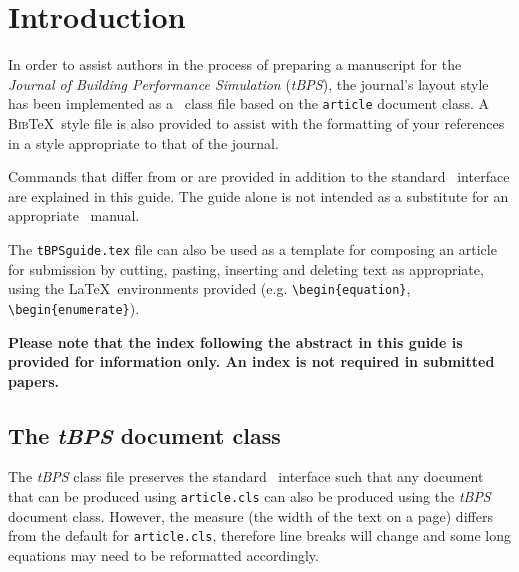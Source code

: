 \documentclass{tBPS2e}
\theoremstyle{plain}
\theoremstyle{definition}
\theoremstyle{remark}
\begin{document}
\section{Introduction}

In order to assist authors in the process of preparing a manuscript for the \textit{Journal of Building Performance Simulation} (\textit{tBPS}), the journal's layout style has been implemented as a \LaTeXe\ class file based on the \texttt{article} document class. A \textsc{Bib}\TeX\ style file is also provided to assist with the formatting of your references in a style appropriate to that of the journal.

Commands that differ from or are provided in addition to the standard \LaTeXe\ interface are explained in this guide. The guide alone is not intended as a substitute for an appropriate \LaTeXe\ manual.

The \texttt{tBPSguide.tex} file can also be used as a template for composing an article for submission by cutting, pasting, inserting and
deleting text as appropriate, using the \LaTeX\ environments provided (e.g. \verb"\begin{equation}", \verb"\begin{enumerate}").

\textbf{Please note that the index following the abstract in this guide is provided for information only. An index is not required in submitted papers.}


\subsection{The \textit{tBPS} document class}\label{class}

The \textit{tBPS} class file preserves the standard \LaTeXe\ interface such that any document that can
be produced using \texttt{article.cls} can also be produced using the \textit{tBPS} document class.
However, the measure (the width of the text on a page) differs from the default for \texttt{article.cls}, therefore line breaks
will change and some long equations may need to be reformatted accordingly.
\end{document}
